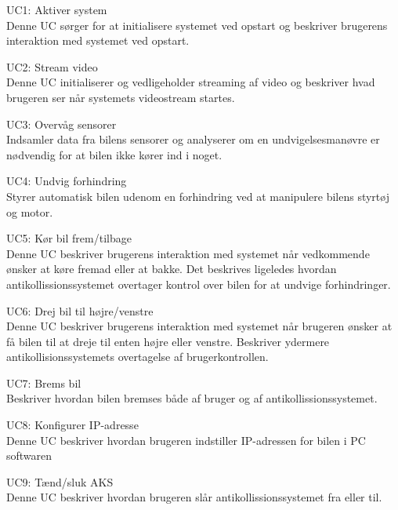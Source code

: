 \begin{packed_item}

\item UC1: Aktiver system \\
Denne UC sørger for at initialisere systemet ved opstart og beskriver brugerens interaktion med systemet ved opstart.

\item UC2: Stream video \\
Denne UC initialiserer og vedligeholder streaming af video og beskriver hvad brugeren ser når systemets videostream startes.

\item UC3: Overvåg sensorer \\
Indsamler data fra bilens sensorer og analyserer om en undvigelsesmanøvre er nødvendig for at bilen ikke kører ind i noget.

\item UC4: Undvig forhindring \\
Styrer automatisk bilen udenom en forhindring ved at manipulere bilens styrtøj og motor.

\item UC5: Kør bil frem/tilbage\\
Denne UC beskriver brugerens interaktion med systemet når vedkommende ønsker at køre fremad eller at bakke. 
Det beskrives ligeledes hvordan antikollissionssystemet overtager kontrol over bilen for at undvige forhindringer.

\item UC6: Drej bil til højre/venstre \\
Denne UC beskriver brugerens interaktion med systemet når brugeren ønsker at få bilen til at dreje til enten højre eller venstre. Beskriver ydermere antikollisionssystemets overtagelse af brugerkontrollen.

\item UC7: Brems bil \\
Beskriver hvordan bilen bremses både af bruger og af antikollissionssystemet.

\item UC8: Konfigurer IP-adresse \\
Denne UC beskriver hvordan brugeren indstiller IP-adressen for bilen i PC softwaren

\item UC9: Tænd/sluk AKS \\
Denne UC beskriver hvordan brugeren slår antikollissionssystemet fra eller til.


\end{packed_item}
